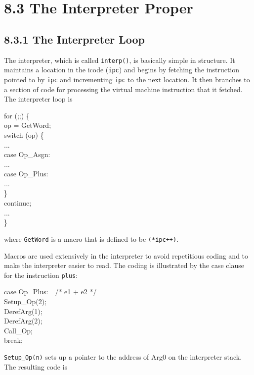 \section[8.3 The Interpreter Proper]{8.3 The Interpreter Proper}
\subsection[8.3.1 The Interpreter Loop]{8.3.1 The Interpreter Loop}

The interpreter, which is called \texttt{interp()}, is basically
simple in structure. It maintains a location in the icode
(\texttt{ipc}) and begins by fetching the instruction pointed to by
\texttt{ipc} and incrementing \texttt{ipc} to the next location. It
then branches to a section of code for processing the virtual machine
instruction that it fetched. The interpreter loop is

\begin{iconcode}
\>for (;;) \{\\
\>\>op = GetWord;\\
\>\>switch (op) \{\\
\>\>\>...\\
\>\>\>case Op\_Asgn:\\
\>\>\>...\\
\>\>\>case Op\_Plus:\\
\>\>\>...\\
\>\>\>\}\\
\>\>continue;\\
\>\>\>...\\
\>\>\}
\end{iconcode}

\noindent
where \texttt{GetWord} is a macro that is defined to be \texttt{(*ipc++)}.

Macros are used extensively in the interpreter to avoid repetitious
coding and to make the interpreter easier to read.  The coding is
illustrated by the case clause for the instruction \texttt{plus}:

\begin{iconcode}
\>case Op\_Plus:\ \ /* e1 + e2 */\\
\>\>Setup\_Op(2);\\
\>\>DerefArg(1);\\
\>\>DerefArg(2);\\
\>\>Call\_Op;\\
\>\>break;
\end{iconcode}



\texttt{Setup\_Op(n)} sets up a pointer to the address of Arg0 on the
interpreter stack. The resulting code is

